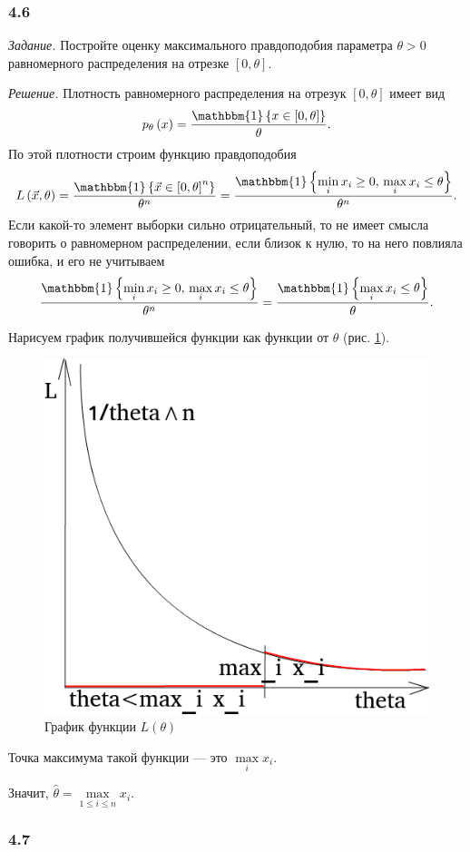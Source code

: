 \subsubsection*{4.6}

\textit{Задание.}
Постройте оценку максимального правдоподобия параметра $ \theta > 0$
равномерного распределения на отрезке $ \left[ 0, \theta \right] $.

\textit{Решение.}
Плотность равномерного распределения на отрезук $ \left[ 0, \theta \right] $ имеет вид
$$p_{ \theta } \left( x \right) =
  \frac{ \mathbbm{1} \left\{ x \in \left[ 0, \theta \right] \right\} }{ \theta }.$$
По этой плотности строим функцию правдоподобия
$$L \left( \vec{x}, \theta \right) =
  \frac{ \mathbbm{1} \left\{ \vec{x} \in \left[ 0, \theta \right]^n \right\} }{ \theta^n} =
  \frac{ \mathbbm{1} \left\{ \min \limits_i x_i \geq 0, \, \max \limits_i x_i \leq \theta \right\} }{ \theta^n}.$$
Если какой-то элемент выборки сильно отрицательный,
то не имеет смысла говорить о равномерном распределении, если близок к нулю,
то на него повлияла ошибка, и его не учитываем
$$ \frac{ \mathbbm{1} \left\{ \min \limits_i x_i \geq 0, \, \max \limits_i x_i \leq \theta \right\} }{ \theta^n} =
  \frac{ \mathbbm{1} \left\{ \max \limits_i x_i \leq \theta \right\} }{ \theta }.$$

Нарисуем график получившейся функции как функции от $ \theta $ (рис. \ref{fig:46}).

\begin{figure}[h!]
  \centering
  \includegraphics[width=.4\textwidth]{./pictures/4_6.png}
  \caption{График функции $L \left( \theta \right) $}
  \label{fig:46}
\end{figure}

Точка максимума такой функции --- это $ \max \limits_i x_i$.

Значит, $ \hat{ \theta } = \max \limits_{1 \leq i \leq n} x_i$.

\subsubsection*{4.7}

